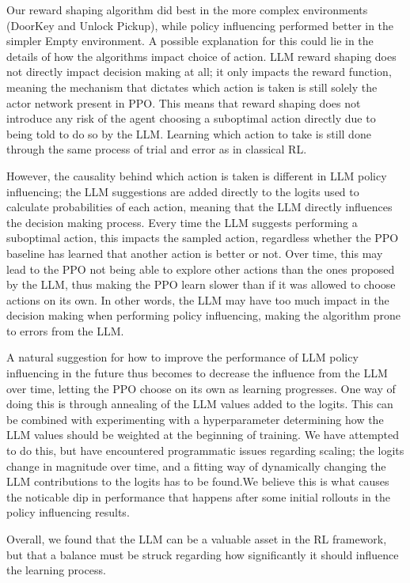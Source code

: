 \documentclass[conference]{IEEEtran}
\begin{document}
Our reward shaping algorithm did best in the more complex environments (DoorKey and Unlock Pickup), while policy influencing performed better in the simpler Empty environment. A possible explanation for this could lie in the details of how the algorithms impact choice of action. LLM reward shaping does not directly impact decision making at all; it only impacts the reward function, meaning the mechanism that dictates which action is taken is still solely the actor network present in PPO. This means that reward shaping does not introduce any risk of the agent choosing a suboptimal action directly due to being told to do so by the LLM. Learning which action to take is still done through the same process of trial and error as in classical RL.

However, the causality behind which action is taken is different in LLM policy influencing; the LLM suggestions are added directly to the logits used to calculate probabilities of each action, meaning that the LLM directly influences the decision making process. Every time the LLM suggests performing a suboptimal action, this impacts the sampled action, regardless whether the PPO baseline has learned that another action is better or not. Over time, this may lead to the PPO not being able to explore other actions than the ones proposed by the LLM, thus making the PPO learn slower than if it was allowed to choose actions on its own. In other words, the LLM may have too much impact in the decision making when performing policy influencing, making the algorithm prone to errors from the LLM.

A natural suggestion for how to improve the performance of LLM policy influencing in the future thus becomes to decrease the influence from the LLM over time, letting the PPO choose on its own as learning progresses. One way of doing this is through annealing of the LLM values added to the logits. This can be combined with experimenting with a hyperparameter determining how the LLM values should be weighted at the beginning of training. We have attempted to do this, but have encountered programmatic issues regarding scaling; the logits change in magnitude over time, and a fitting way of dynamically changing the LLM contributions to the logits has to be found.We believe this is what causes the noticable dip in performance that happens after some initial rollouts in the policy influencing results.

Overall, we found that the LLM can be a valuable asset in the RL framework, but that a balance must be struck regarding how significantly it should influence the learning process.
\end{document}

